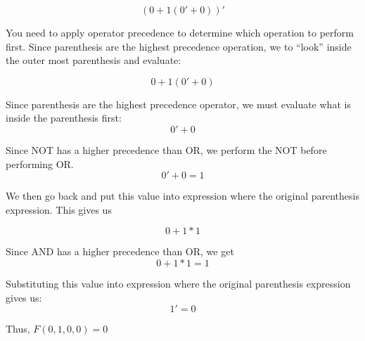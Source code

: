 $$(0 + 1(0' + 0))'$$

You need to apply operator precedence to determine which operation to perform
first.  Since parenthesis are the highest precedence operation, we to ``look'' inside the
outer most parenthesis and evaluate:

$$0 + 1(0' + 0)$$

Since parenthesis are the highest precedence operator, we must evaluate what is inside the
parenthesis first:
$$0' + 0$$

Since NOT has a higher precedence than OR, we perform the NOT before performing OR.
$$0' + 0 = 1$$

We then go back and put this value into expression where the original parenthesis expression. 
This gives us

$$0 + 1*1$$

Since AND has a higher precedence than OR, we get
$$0 + 1*1 = 1$$

Substituting this value into expression where the original parenthesis expression gives us:
$$1' = 0$$

Thus, $F(0,1,0,0) = 0$
\vspace{0.2cm}



